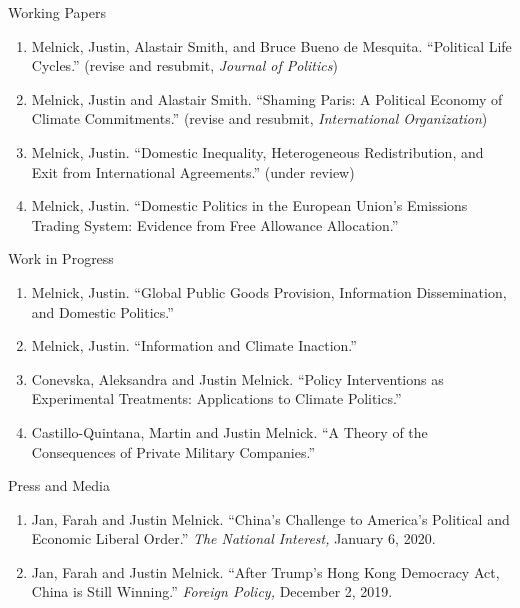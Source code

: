 \documentclass{resume} %
\begin{document}
\begin{rSection}{Working Papers}

\begin{enumerate}

    \item Melnick, Justin, Alastair Smith, and Bruce Bueno de Mesquita. ``Political Life Cycles.'' (revise and resubmit, \textit{Journal of Politics})
        \item Melnick, Justin and Alastair Smith. ``Shaming Paris: A Political Economy of Climate Commitments.'' (revise and resubmit, \textit{International Organization})
            \item Melnick, Justin. ``Domestic Inequality, Heterogeneous Redistribution, and Exit from International Agreements.'' (under review)
        \item Melnick, Justin. ``Domestic Politics in the European Union’s Emissions Trading System: Evidence from Free Allowance Allocation.''
\end{enumerate}

\end{rSection}

\begin{rSection}{Work in Progress}

\begin{enumerate}
    \item Melnick, Justin. ``Global Public Goods Provision, Information Dissemination, and Domestic Politics.'' 
    \item Melnick, Justin. ``Information and Climate Inaction.''
    \item Conevska, Aleksandra and Justin Melnick. ``Policy Interventions as Experimental Treatments: Applications to Climate Politics.''
    \item Castillo-Quintana, Martin and Justin Melnick. ``A Theory of the Consequences of Private Military Companies.''
\end{enumerate}

\end{rSection}

\begin{rSection}{Press and Media}
    \begin{enumerate}
    \item   Jan, Farah and Justin Melnick. ``China's Challenge to America's Political and Economic Liberal Order.'' \textit{The National Interest,} January 6, 2020.
    \item    Jan, Farah and Justin Melnick. ``After Trump's Hong Kong Democracy Act, China is Still Winning.'' \textit{Foreign Policy,} December 2, 2019.
\end{enumerate}
\end{rSection}
\end{document}
